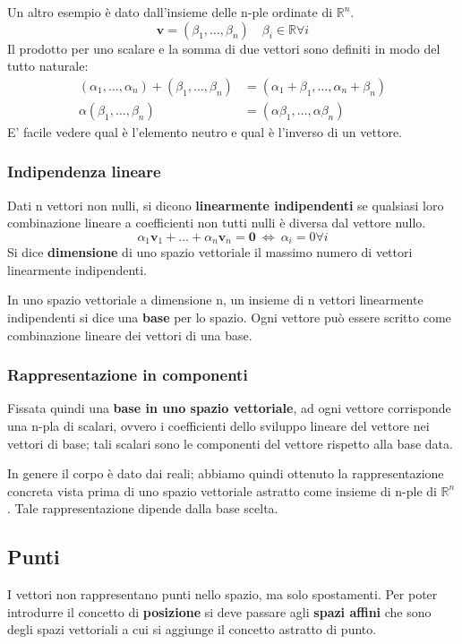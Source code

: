 \documentclass[a4paper, 10pt]{article}
\renewcommand{\vec}{\bm}
\newcommand{\numberset}{\mathbb}
\newcommand{\R}{\numberset{R}}
\begin{document}
			\vspace*{0.5cm}
			
			\noindent
			Un altro esempio è dato dall'insieme delle n-ple ordinate di $ \R^n $.
			\[
				\vec{v} = (\beta_1, \dots, \beta_n) \quad \beta_i \in \R \forall i
			\]
			Il prodotto per uno scalare e la somma di due vettori sono
			definiti in modo del tutto naturale:
			\begin{align*}
				(\alpha_1, \dots, \alpha_n) + (\beta_1, \dots, \beta_n) &= 
				(\alpha_1 + \beta_1, \dots, \alpha_n + \beta_n) \\
				\alpha(\beta_1, \dots, \beta_n) &= (\alpha\beta_1, \dots, \alpha\beta_n)
			\end{align*}
			E' facile vedere qual è l'elemento neutro e qual è l'inverso di un
			vettore.
			
		\subsubsection{Indipendenza lineare}
			Dati n vettori non nulli, si dicono \textbf{linearmente indipendenti} se
			qualsiasi loro combinazione lineare a coefficienti non tutti nulli
			è diversa dal vettore nullo.
			\[
				\alpha_1\vec{v}_1 + \dots + \alpha_n \vec{v}_n = \vec{0} \: \Leftrightarrow \: \alpha_i = 0 \forall i
			\]
			Si dice \textbf{dimensione} di uno spazio vettoriale il massimo numero
			di vettori linearmente indipendenti.
			
			\noindent
			In uno spazio vettoriale a dimensione n, un insieme di n vettori
			linearmente indipendenti si dice una \textbf{base} per lo spazio.
			Ogni vettore può essere scritto come combinazione lineare dei
			vettori di una base.
		\subsubsection{Rappresentazione in componenti}
			Fissata quindi una \textbf{base in uno spazio vettoriale}, ad ogni
			vettore corrisponde una n-pla di scalari, ovvero i coefficienti
			dello sviluppo lineare del vettore nei vettori di base; tali scalari
			sono le componenti del vettore rispetto alla base data.
			
			\noindent
			In genere il corpo è dato dai reali; abbiamo quindi ottenuto la
			rappresentazione concreta vista prima di uno spazio vettoriale
			astratto come insieme di n-ple di $ \R^n $.
			Tale rappresentazione dipende dalla base scelta.
			
		\subsection{Punti}
			I vettori non rappresentano punti nello spazio, ma solo
			spostamenti. Per poter introdurre il concetto di \textbf{posizione} si
			deve passare agli \textbf{spazi affini} che sono degli spazi vettoriali a
			cui si aggiunge il concetto astratto di punto.
			
\end{document}
